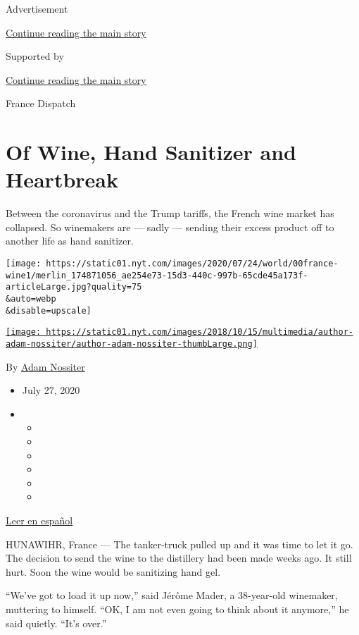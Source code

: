 Advertisement

\protect\hyperlink{after-top}{Continue reading the main story}

Supported by

\protect\hyperlink{after-sponsor}{Continue reading the main story}

France Dispatch

\hypertarget{of-wine-hand-sanitizer-and-heartbreak}{%
\section{Of Wine, Hand Sanitizer and
Heartbreak}\label{of-wine-hand-sanitizer-and-heartbreak}}

Between the coronavirus and the Trump tariffs, the French wine market
has collapsed. So winemakers are --- sadly --- sending their excess
product off to another life as hand sanitizer.

\texttt{[image: https://static01.nyt.com/images/2020/07/24/world/00france-wine1/merlin\_174871056\_ae254e73-15d3-440c-997b-65cde45a173f-articleLarge.jpg?quality=75\\\&auto=webp\\\&disable=upscale]}

\href{https://www.nytimes.com/by/adam-nossiter}{\texttt{[image: https://static01.nyt.com/images/2018/10/15/multimedia/author-adam-nossiter/author-adam-nossiter-thumbLarge.png]}}

By \href{https://www.nytimes.com/by/adam-nossiter}{Adam Nossiter}

\begin{itemize}
\item
  July 27, 2020
\item
  \begin{itemize}
  \item
  \item
  \item
  \item
  \item
  \item
  \end{itemize}
\end{itemize}

\href{https://www.nytimes.com/es/2020/07/28/espanol/mundo/vino-blanco-alsacia-coronavirus.html}{Leer
en español}

HUNAWIHR, France --- The tanker-truck pulled up and it was time to let
it go. The decision to send the wine to the distillery had been made
weeks ago. It still hurt. Soon the wine would be sanitizing hand gel.

``We've got to load it up now,'' said Jérôme Mader, a 38-year-old
winemaker, muttering to himself. ``OK, I am not even going to think
about it anymore,'' he said quietly. ``It's over.''

